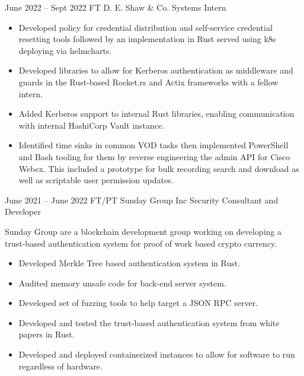 \documentclass[
	9pt, %
]{FreemanCV}
\begin{document}
\begin{paracol}{2}
\jobentry
	{June 2022 -- Sept 2022} %
	{FT} %
	{D. E. Shaw \& Co.} %
	{Systems Intern} %
	{\begin{itemize}[noitemsep, topsep=0pt, partopsep=0pt, leftmargin=8pt, before =\leavevmode\vspace*{-\baselineskip}]
			\item Developed policy for credential distribution and self-service credential resetting tools followed by an implementation in Rust served using k8s deploying via helmcharts.
			\item Developed libraries to allow for Kerberos authentication as middleware and guards in the Rust-based Rocket.rs and Actix frameworks with a fellow intern.
			\item  Added Kerberos support to internal Rust libraries, enabling communication with internal HashiCorp Vault instance. 
			\item Identified time sinks in common VOD tasks then implemented 
			PowerShell and Bash tooling for them by reverse engineering the admin API for Cisco Webex. 
			This included a prototype for bulk recording search and download as well as scriptable user permission updates. 
	\end{itemize}} %

\jobentry
	{June 2021 -- June 2022} %
	{FT/PT} %
	{Sunday Group Inc} %
	{Security Consultant and Developer} %
	{
	Sunday Group are a blockchain development group working on developing a trust-based authentication 
	system for proof of work based crypto currency. 
	\medspace

	\begin{itemize}[noitemsep, topsep=0pt, partopsep=0pt, leftmargin=8pt]
		\item	Developed Merkle Tree based authentication system in Rust.
		\item	Audited memory unsafe code for back-end server system.
		\item	Developed set of fuzzing tools to help target a JSON RPC server.
		\item	Developed and tested the trust-based authentication system from white papers in Rust.
		\item	Developed and deployed containerized instances to allow for software to run regardless of hardware. 
	\end{itemize}
	} %


\end{paracol}
\end{document}
